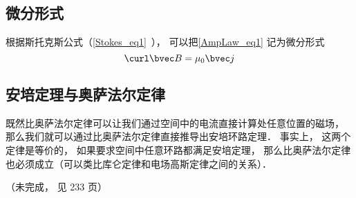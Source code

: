 \subsection{微分形式}
根据斯托克斯公式（\autoref{Stokes_eq1}~）， 可以把\autoref{AmpLaw_eq1} 记为微分形式
\begin{equation}\label{AmpLaw_eq2}
\curl \bvec B = \mu_0 \bvec j
\end{equation}



\subsection{安培定理与奥萨法尔定律}
既然比奥萨法尔定律可以让我们通过空间中的电流直接计算处任意位置的磁场， 那么我们就可以通过比奥萨法尔定律直接推导出安培环路定理． 事实上， 这两个定律是等价的， 如果要求空间中任意环路都满足安培定理， 那么比奥萨法尔定律也必须成立（可以类比库仑定律和电场高斯定律之间的关系）．%



（未完成， 见 \cite{GriffE} 233 页）

